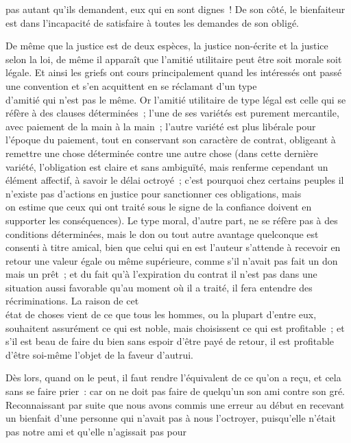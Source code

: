 \documentclass[french,twoside]{book} %
\begin{document}
pas autant qu’ils demandent, eux qui en sont dignes ! De son côté, le bienfaiteur est dans l’incapacité de satisfaire à toutes les demandes de son obligé.\par
De même que la justice est de deux espèces, la justice non-écrite et la justice selon la loi, de même il apparaît que l’amitié utilitaire peut être soit morale soit légale. Et ainsi les griefs ont cours principalement quand les intéressés ont passé une convention et s’en acquittent en se réclamant d’un type \\
d’amitié qui n’est pas le même. Or l’amitié utilitaire de type légal est celle qui se réfère à des clauses déterminées ; l’une de ses variétés est purement mercantile, avec paiement de la main à la main ; l’autre variété est plus libérale pour l’époque du paiement, tout en conservant son caractère de contrat, obligeant à remettre une chose déterminée contre une autre chose (dans cette dernière variété, l’obligation est claire et sans ambiguïté, mais renferme cependant un élément affectif, à savoir le délai octroyé ; c’est pourquoi chez certains peuples il n’existe pas d’actions en justice pour sanctionner ces obligations, mais \\
on estime que ceux qui ont traité sous le signe de la confiance doivent en supporter les conséquences). Le type moral, d’autre part, ne se réfère pas à des conditions déterminées, mais le don ou tout autre avantage quelconque est consenti à titre amical, bien que celui qui en est l’auteur s’attende à recevoir en retour une valeur égale ou même supérieure, comme s’il n’avait pas fait un don mais un prêt ; et du fait qu’à l’expiration du contrat il n’est pas dans une situation aussi favorable qu’au moment où il a traité, il fera entendre des récriminations. La raison de cet \\
état de choses vient de ce que tous les hommes, ou la plupart d’entre eux, souhaitent assurément ce qui est noble, mais choisissent ce qui est profitable ; et s’il est beau de faire du bien sans espoir d’être payé de retour, il est profitable d’être  soi-même l’objet de la faveur d’autrui.\par
Dès lors, quand on le peut, il faut rendre l’équivalent de ce qu’on a reçu, et cela sans se faire prier : car on ne doit pas faire de quelqu’un son ami contre son gré. Reconnaissant par suite que nous avons commis une erreur au début en recevant un bienfait d’une personne qui n’avait pas à nous l’octroyer, puisqu’elle n’était pas notre ami et qu’elle n’agissait pas pour \\
\end{document}
